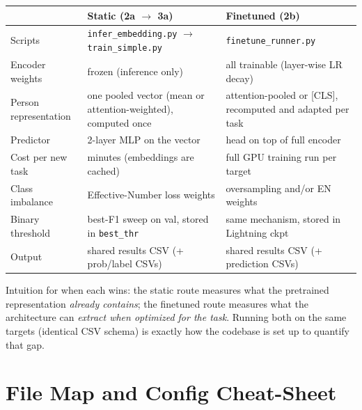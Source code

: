 \documentclass[11pt,a4paper]{article}
\newcommand{\file}[1]{\texttt{\small #1}}
\newcommand{\code}[1]{\texttt{\small #1}}
\begin{document}
\begin{center}\small
\begin{tabular}{@{}p{3.4cm}p{5.4cm}p{5.4cm}@{}}
\toprule
 & \textbf{Static (2a $\to$ 3a)} & \textbf{Finetuned (2b)} \\
\midrule
Scripts & \file{infer\_embedding.py} $\to$ \file{train\_simple.py} & \file{finetune\_runner.py} \\
Encoder weights & frozen (inference only) & all trainable (layer-wise LR decay) \\
Person representation & one pooled vector (mean or attention-weighted), computed once & attention-pooled or [CLS], recomputed and adapted per task \\
Predictor & 2-layer MLP on the vector & head on top of full encoder \\
Cost per new task & minutes (embeddings are cached) & full GPU training run per target \\
Class imbalance & Effective-Number loss weights & oversampling and/or EN weights \\
Binary threshold & best-F1 sweep on val, stored in \code{best\_thr} & same mechanism, stored in Lightning ckpt \\
Output & shared results CSV (+ prob/label CSVs) & shared results CSV (+ prediction CSVs) \\
\bottomrule
\end{tabular}
\end{center}

\noindent Intuition for when each wins: the static route measures what the
pretrained representation \emph{already contains}; the finetuned route measures
what the architecture can \emph{extract when optimized for the task}. Running
both on the same targets (identical CSV schema) is exactly how the codebase is
set up to quantify that gap.

\section{File Map and Config Cheat-Sheet}
\end{document}
